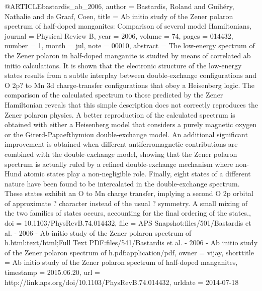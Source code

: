 @ARTICLE{bastardis_ab_2006,
  author = {Bastardis, Roland and Guihéry, Nathalie and de Graaf, Coen},
  title = {Ab initio study of the {Zener} polaron spectrum of half-doped manganites:
	{Comparison} of several model {Hamiltonians}},
  journal = {Physical Review B},
  year = {2006},
  volume = {74},
  pages = {014432},
  number = {1},
  month = jul,
  note = {00010},
  abstract = {The low-energy spectrum of the Zener polaron in half-doped manganite
	is studied by means of correlated ab initio calculations. It is shown
	that the electronic structure of the low-energy states results from
	a subtle interplay between double-exchange configurations and O 2p?
	to Mn 3d charge-transfer configurations that obey a Heisenberg logic.
	The comparison of the calculated spectrum to those predicted by the
	Zener Hamiltonian reveals that this simple description does not correctly
	reproduces the Zener polaron physics. A better reproduction of the
	calculated spectrum is obtained with either a Heisenberg model that
	considers a purely magnetic oxygen or the Girerd-Papaefthymiou double-exchange
	model. An additional significant improvement is obtained when different
	antiferromagnetic contributions are combined with the double-exchange
	model, showing that the Zener polaron spectrum is actually ruled
	by a refined double-exchange mechanism where non-Hund atomic states
	play a non-negligible role. Finally, eight states of a different
	nature have been found to be intercalated in the double-exchange
	spectrum. These states exhibit an O to Mn charge transfer, implying
	a second O 2p orbital of approximate ? character instead of the usual
	? symmetry. A small mixing of the two families of states occurs,
	accounting for the final ordering of the states.},
  doi = {10.1103/PhysRevB.74.014432},
  file = {APS Snapshot:files/501/Bastardis et al. - 2006 - Ab initio study of the Zener polaron spectrum of h.html:text/html;Full Text PDF:files/541/Bastardis et al. - 2006 - Ab initio study of the Zener polaron spectrum of h.pdf:application/pdf},
  owner = {vijay},
  shorttitle = {Ab initio study of the {Zener} polaron spectrum of half-doped manganites},
  timestamp = {2015.06.20},
  url = {http://link.aps.org/doi/10.1103/PhysRevB.74.014432},
  urldate = {2014-07-18}
}

